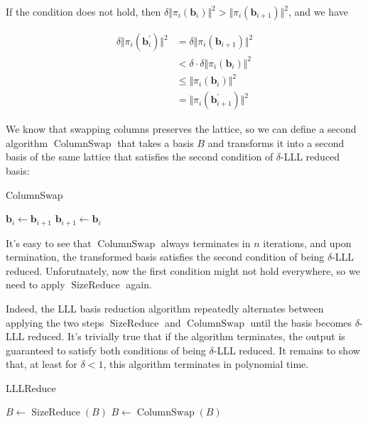 If the condition does not hold, then $\delta\Vert\pi_i(\mathbf{b}_i)\Vert^2 > \Vert\pi_i(\mathbf{b}_{i+1})\Vert^2$, and we have

$$
\begin{aligned}
\delta \Vert\pi_i(\mathbf{b}_i^\prime)\Vert^2
&= \delta \Vert\pi_i(\mathbf{b}_{i+1})\Vert^2 \\
&< \delta \cdot \delta\Vert\pi_i(\mathbf{b}_i)\Vert^2 \\
&\leq \Vert\pi_i(\mathbf{b}_i)\Vert^2 \\
&= \Vert\pi_i(\mathbf{b}_{i+1}^\prime)\Vert^2
\end{aligned}
$$

We know that swapping columns preserves the lattice, so we can define a second algorithm $\operatorname{ColumnSwap}$ that takes a basis $B$ and transforms it into a second basis of the same lattice that satisfies the second condition of $\delta$-LLL reduced basis:

\begin{algorithm}
\caption{ColumnSwap}
\begin{algorithmic}[1]
            \State $\mathbf{b}_i \leftarrow \mathbf{b}_{i+1}$
            \State $\mathbf{b}_{i+1} \leftarrow \mathbf{b}_{i}$
        \EndIf
    \EndFor
\end{algorithmic}
\end{algorithm}

It's easy to see that $\operatorname{ColumnSwap}$ always terminates in $n$ iterations, and upon termination, the transformed basis satisfies the second condition of being $\delta$-LLL reduced. Unforutnately, now the first condition might not hold everywhere, so we need to apply $\operatorname{SizeReduce}$ again.

Indeed, the LLL basis reduction algorithm repeatedly alternates between applying the two steps $\operatorname{SizeReduce}$ and $\operatorname{ColumnSwap}$ until the basis becomes $\delta$-LLL reduced. It's trivially true that if the algorithm terminates, the output is guaranteed to satisfy both conditions of being $\delta$-LLL reduced. It remains to show that, at least for $\delta < 1$, this algorithm terminates in polynomial time.

\begin{algorithm}
\caption{LLLReduce}
\begin{algorithmic}[1]
        \State $B \leftarrow \operatorname{SizeReduce}(B)$
        \State $B \leftarrow \operatorname{ColumnSwap}(B)$
    \EndWhile
\end{algorithmic}
\end{algorithm}

